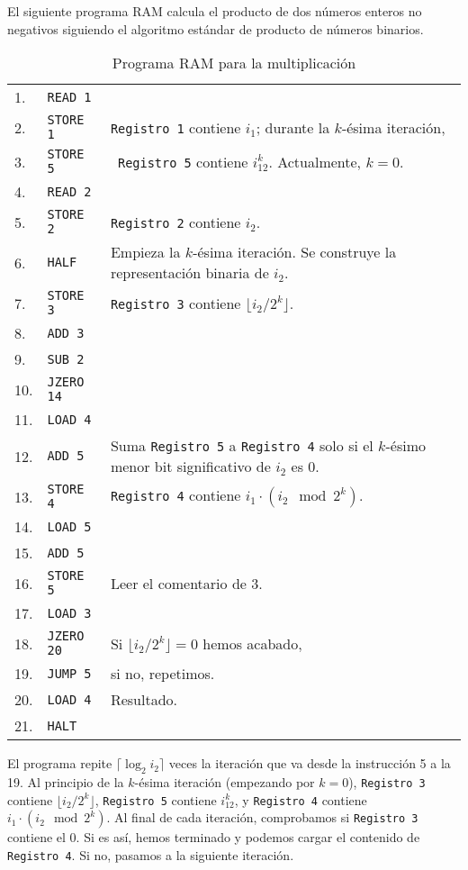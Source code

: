 \documentclass[twoside]{article}
\begin{document}
\begin{ej}
El siguiente programa RAM calcula el producto de dos números enteros no negativos siguiendo el algoritmo estándar de producto de números binarios.
\begin{table}[h!]
\begin{tabular}{l l l}
1. & \texttt{READ 1} &\\
2. & \texttt{STORE 1} & \texttt{Registro 1} contiene $i_1$; durante la $k$-ésima iteración,\\
3. & \texttt{STORE 5} & \ \texttt{Registro 5} contiene $i_12^k$. Actualmente, $k=0$.\\
4. & \texttt{READ 2} & \\
5. & \texttt{STORE 2} & \texttt{Registro 2} contiene $i_2$. \\
6. & \texttt{HALF} & Empieza la $k$-ésima iteración. Se construye la representación binaria de $i_2$.\\
7. & \texttt{STORE 3} & \texttt{Registro 3} contiene $\lfloor i_2/2^k\rfloor$.\\
8. & \texttt{ADD 3}  & \\
9. & \texttt{SUB 2}  & \\
10. & \texttt{JZERO 14} & \\
11. & \texttt{LOAD 4} &  \\
12. & \texttt{ADD 5} & Suma \texttt{Registro 5} a \texttt{Registro 4} solo si el $k$-ésimo menor bit significativo de $i_2$ es 0.\\
13. & \texttt{STORE 4} & \texttt{Registro 4} contiene $i_1\cdot (i_2\mod 2^k)$.\\
14. & \texttt{LOAD 5} & \\
15. & \texttt{ADD 5} & \\
16. & \texttt{STORE 5} & Leer el comentario de 3.\\
17. & \texttt{LOAD 3} & \\
18. & \texttt{JZERO 20} & Si $\lfloor i_2/2^k\rfloor=0$ hemos acabado,\\
19. & \texttt{JUMP 5} & si no, repetimos.\\
20. & \texttt{LOAD 4} & Resultado.\\
21. & \texttt{HALT} &
\end{tabular}
\caption{Programa RAM para la multiplicación}\label{mply}
\end{table}

El programa repite $\lceil \log_2 i_2\rceil$ veces la iteración que va desde la instrucción 5 a la 19. Al principio de la $k$-ésima iteración (empezando por $k=0$), \texttt{Registro 3} contiene $\lfloor i_2/2^k\rfloor$, \texttt{Registro 5} contiene $i_12^k$, y \texttt{Registro 4} contiene $i_1\cdot (i_2\mod 2^k)$. Al final de cada iteración, comprobamos si \texttt{Registro 3} contiene el 0. Si es así, hemos terminado y podemos cargar el contenido de \texttt{Registro 4}. Si no, pasamos a la siguiente iteración.


\end{ej}
\end{document}

